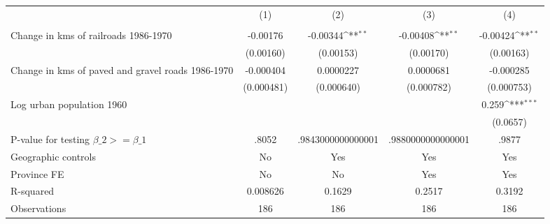 {
\def\sym#1{\ifmmode^{#1}\else\(^{#1}\)\fi}
\begin{tabular}{l*{4}{c}}
\hline\hline
                &\multicolumn{1}{c}{(1)}&\multicolumn{1}{c}{(2)}&\multicolumn{1}{c}{(3)}&\multicolumn{1}{c}{(4)}\\
                &\multicolumn{1}{c}{}&\multicolumn{1}{c}{}&\multicolumn{1}{c}{}&\multicolumn{1}{c}{}\\
\hline
Change in kms of railroads 1986-1970& -0.00176         & -0.00344\sym{**} & -0.00408\sym{**} & -0.00424\sym{**} \\
                &(0.00160)         &(0.00153)         &(0.00170)         &(0.00163)         \\
[1em]
Change in kms of paved and gravel roads 1986-1970&-0.000404         &0.0000227         &0.0000681         &-0.000285         \\
                &(0.000481)         &(0.000640)         &(0.000782)         &(0.000753)         \\
[1em]
Log urban population 1960&                  &                  &                  &    0.259\sym{***}\\
                &                  &                  &                  & (0.0657)         \\
\hline
P-value for testing $\beta\_{2} >= \beta\_{1}$&    .8052         &.9843000000000001         &.9880000000000001         &    .9877         \\
Geographic controls&       No         &      Yes         &      Yes         &      Yes         \\
Province FE     &       No         &       No         &      Yes         &      Yes         \\
R-squared       & 0.008626         &   0.1629         &   0.2517         &   0.3192         \\
Observations    &      186         &      186         &      186         &      186         \\
\hline\hline
\end{tabular}
}
